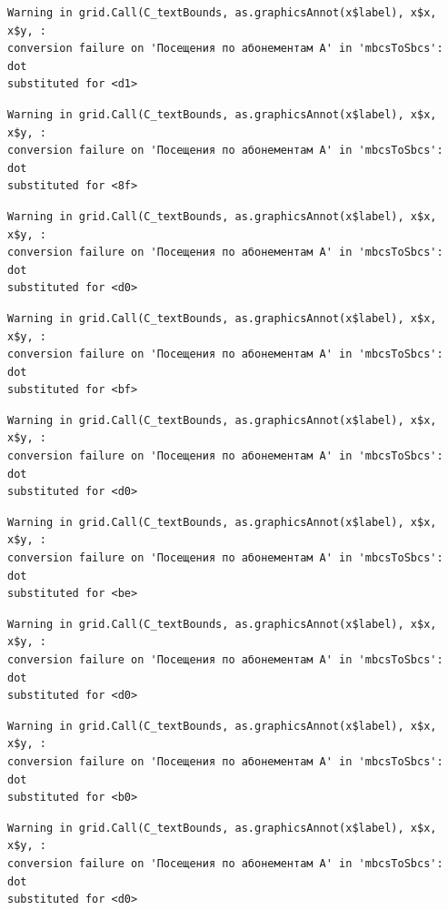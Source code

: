 \documentclass[
  letterpaper,
  DIV=11,
  numbers=noendperiod]{scrartcl}
\begin{document}
\begin{verbatim}
Warning in grid.Call(C_textBounds, as.graphicsAnnot(x$label), x$x, x$y, :
conversion failure on 'Посещения по абонементам А' in 'mbcsToSbcs': dot
substituted for <d1>
\end{verbatim}

\begin{verbatim}
Warning in grid.Call(C_textBounds, as.graphicsAnnot(x$label), x$x, x$y, :
conversion failure on 'Посещения по абонементам А' in 'mbcsToSbcs': dot
substituted for <8f>
\end{verbatim}

\begin{verbatim}
Warning in grid.Call(C_textBounds, as.graphicsAnnot(x$label), x$x, x$y, :
conversion failure on 'Посещения по абонементам А' in 'mbcsToSbcs': dot
substituted for <d0>
\end{verbatim}

\begin{verbatim}
Warning in grid.Call(C_textBounds, as.graphicsAnnot(x$label), x$x, x$y, :
conversion failure on 'Посещения по абонементам А' in 'mbcsToSbcs': dot
substituted for <bf>
\end{verbatim}

\begin{verbatim}
Warning in grid.Call(C_textBounds, as.graphicsAnnot(x$label), x$x, x$y, :
conversion failure on 'Посещения по абонементам А' in 'mbcsToSbcs': dot
substituted for <d0>
\end{verbatim}

\begin{verbatim}
Warning in grid.Call(C_textBounds, as.graphicsAnnot(x$label), x$x, x$y, :
conversion failure on 'Посещения по абонементам А' in 'mbcsToSbcs': dot
substituted for <be>
\end{verbatim}

\begin{verbatim}
Warning in grid.Call(C_textBounds, as.graphicsAnnot(x$label), x$x, x$y, :
conversion failure on 'Посещения по абонементам А' in 'mbcsToSbcs': dot
substituted for <d0>
\end{verbatim}

\begin{verbatim}
Warning in grid.Call(C_textBounds, as.graphicsAnnot(x$label), x$x, x$y, :
conversion failure on 'Посещения по абонементам А' in 'mbcsToSbcs': dot
substituted for <b0>
\end{verbatim}

\begin{verbatim}
Warning in grid.Call(C_textBounds, as.graphicsAnnot(x$label), x$x, x$y, :
conversion failure on 'Посещения по абонементам А' in 'mbcsToSbcs': dot
substituted for <d0>
\end{verbatim}
\end{document}
